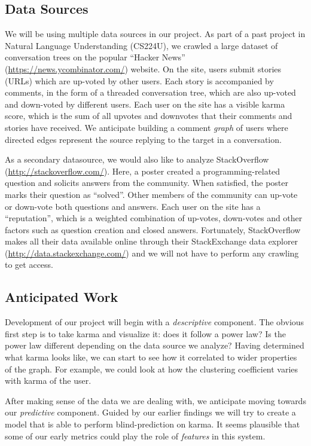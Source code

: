 \documentclass[11pt]{article}
\begin{document}
\subsection{Data Sources}
We will be using multiple data sources in our project. As part of a past project
in Natural Language Understanding (CS224U), we crawled a large dataset of conversation
trees on the popular ``Hacker News'' (\url{https://news.ycombinator.com/}) website. On the site,
users submit stories (URLs) which are up-voted by other users. Each story is accompanied
by comments, in the form of a threaded conversation tree, which are also up-voted 
and down-voted by different users. Each user on the site has a visible karma score, 
which is the sum of all upvotes and downvotes that their comments and stories have received.
We anticipate building a comment \textit{graph} of users where directed edges represent
the source replying to the target in a conversation.

As a secondary datasource, we would also like to analyze StackOverflow
(\url{http://stackoverflow.com/}). Here, a poster created a programming-related
question and solicits answers from the community. When satisfied, the poster
marks their question as ``solved''. Other members of the community can up-vote
or down-vote both questions and answers. Each user on the site has a
``reputation'', which is a weighted combination of up-votes, down-votes and
other factors such as question creation and closed answers. Fortunately,
StackOverflow makes all their data available online through their StackExchange
data explorer (\url{http://data.stackexchange.com/}) and we will not have to
perform any crawling to get access.

\subsection{Anticipated Work}
Development of our project will begin with a \textit{descriptive}
component. The obvious first step is to take karma and visualize it: does it follow a power law? 
Is the power law different depending on the data source we analyze? Having determined what karma
looks like, we can start to see how it correlated to wider properties of the graph. For example,
we could look at how the clustering coefficient varies with karma of the user.

After making sense of the data we are dealing with, we anticipate moving towards our
\textit{predictive} component. Guided by our earlier findings we will try to create a model
that is able to perform blind-prediction on karma. It seems plausible that some of our 
early metrics could play the role of \textit{features} in this system.
\end{document}
